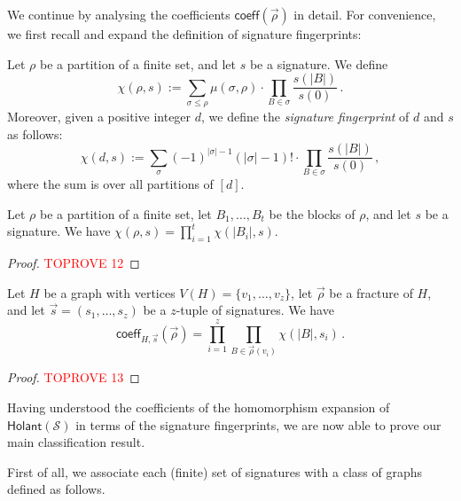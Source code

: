 \documentclass[authorcolumns,numberwithinsect]{no-lipics-v2022}
\newcommand{\holant}{\mathsf{Holant}}
\begin{document}
We continue by analysing the coefficients $\mathsf{coeff}(\vec{\rho})$ in detail. For convenience, we first recall and expand the definition of signature fingerprints:

\begin{definition}
    Let $\rho$ be a partition of a finite set, and let $s$ be a signature. We define 
    \[\chi(\rho,s) := \sum_{\sigma \leq \rho} \mu(\sigma,\rho) \cdot \prod_{B \in \sigma} \frac{s(|B|)}{s(0)}\,.\]
    Moreover, given a positive integer $d$, we define the \emph{signature fingerprint} of $d$ and $s$ as follows:
    \[\chi(d,s) := \sum_{\sigma} (-1)^{|\sigma|-1} (|\sigma|-1)! \cdot \prod_{B \in \sigma} \frac{s(|B|)}{s(0)} \,,\]
    where the sum is over all partitions of $[d]$.
\end{definition}

\begin{lemma}\label{lem:just_distributivity}
    Let $\rho$ be a partition of a finite set, let $B_1,\dots,B_t$ be the blocks of $\rho$, and let $s$ be a signature. We have $\chi(\rho,s) =  \prod_{i=1}^t \chi(|B_i|,s)$.
\end{lemma}
\begin{proof}\textcolor{red}{TOPROVE 12}\end{proof}

\begin{lemma}\label{lem:coeffs_done}
    Let $H$ be a graph with vertices $V(H)=\{v_1,\dots,v_z\}$, let $\vec{\rho}$ be a fracture of $H$, and let $\vec{s}=(s_1,\dots,s_z)$ be a $z$-tuple of signatures. We have
    \[\mathsf{coeff}_{H,\vec{s}}(\vec{\rho}) = \prod_{i=1}^z \prod_{B\in \vec{\rho}(v_i)} \chi(|B|,s_i) \,.\]
\end{lemma}
\begin{proof}\textcolor{red}{TOPROVE 13}\end{proof}

Having understood the coefficients of the homomorphism expansion of $\holant(\mathcal{S})$ in terms of the signature fingerprints, we are now able to prove our main classification result.

First of all, we associate each (finite) set of signatures with a class of graphs defined as follows.
\end{document}

